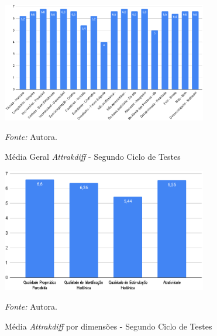 \begin{figure}[h!]
	\centering
	\caption{Média Geral \textit{Attrakdiff} - Segundo Ciclo de Testes}
	\begin{adjustbox}{center}
		\includegraphics[width=0.8\textwidth]{figuras/media-geral1.eps}
	\end{adjustbox}
	\begin{tablenotes}[flushleft]
		\centering
		\item \textit{Fonte:} Autora.
	\end{tablenotes}
	\label{fig28}
\end{figure}

\begin{figure}[h!]
	\centering
	\caption{Média \textit{Attrakdiff} por dimensões - Segundo Ciclo de Testes}
	\begin{adjustbox}{center}
		\includegraphics[width=0.8\textwidth]{figuras/media-separada1.eps}
	\end{adjustbox}
	\begin{tablenotes}[flushleft]
		\centering
		\item \textit{Fonte:} Autora.
	\end{tablenotes}
	\label{fig29}
\end{figure}

